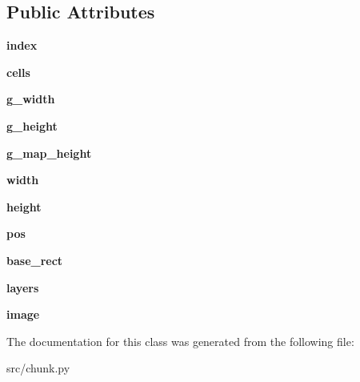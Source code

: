 \subsection*{Public Attributes}
\begin{DoxyCompactItemize}
\item 
\hypertarget{classsrc_1_1chunk_1_1_chunk_a5c816287a257c3913cfa1299f313a2c4}{}\label{classsrc_1_1chunk_1_1_chunk_a5c816287a257c3913cfa1299f313a2c4} 
{\bfseries index}
\item 
\hypertarget{classsrc_1_1chunk_1_1_chunk_ab3c6a9479b6ab41de0f1d261d2974796}{}\label{classsrc_1_1chunk_1_1_chunk_ab3c6a9479b6ab41de0f1d261d2974796} 
{\bfseries cells}
\item 
\hypertarget{classsrc_1_1chunk_1_1_chunk_a1fe08165c2a9f83e277531b6e6809b18}{}\label{classsrc_1_1chunk_1_1_chunk_a1fe08165c2a9f83e277531b6e6809b18} 
{\bfseries g\+\_\+width}
\item 
\hypertarget{classsrc_1_1chunk_1_1_chunk_a538c061a8552e2dc388b0f1ebb18cdc0}{}\label{classsrc_1_1chunk_1_1_chunk_a538c061a8552e2dc388b0f1ebb18cdc0} 
{\bfseries g\+\_\+height}
\item 
\hypertarget{classsrc_1_1chunk_1_1_chunk_af643c615d90588e4562f2f3ce4dea7c4}{}\label{classsrc_1_1chunk_1_1_chunk_af643c615d90588e4562f2f3ce4dea7c4} 
{\bfseries g\+\_\+map\+\_\+height}
\item 
\hypertarget{classsrc_1_1chunk_1_1_chunk_a1a79b666024d683456a617686d6a2ca2}{}\label{classsrc_1_1chunk_1_1_chunk_a1a79b666024d683456a617686d6a2ca2} 
{\bfseries width}
\item 
\hypertarget{classsrc_1_1chunk_1_1_chunk_a7867388e5f0e24d9c7661baa9d350170}{}\label{classsrc_1_1chunk_1_1_chunk_a7867388e5f0e24d9c7661baa9d350170} 
{\bfseries height}
\item 
\hypertarget{classsrc_1_1chunk_1_1_chunk_a9d8dca536e1f7f9347fb19db7888098c}{}\label{classsrc_1_1chunk_1_1_chunk_a9d8dca536e1f7f9347fb19db7888098c} 
{\bfseries pos}
\item 
\hypertarget{classsrc_1_1chunk_1_1_chunk_ada69235ab6825d1362515c389e73caf3}{}\label{classsrc_1_1chunk_1_1_chunk_ada69235ab6825d1362515c389e73caf3} 
{\bfseries base\+\_\+rect}
\item 
\hypertarget{classsrc_1_1chunk_1_1_chunk_acdf7dc448b4dc155cdd64f37c1cb1d2b}{}\label{classsrc_1_1chunk_1_1_chunk_acdf7dc448b4dc155cdd64f37c1cb1d2b} 
{\bfseries layers}
\item 
\hypertarget{classsrc_1_1chunk_1_1_chunk_aa77c24ac65ef09e6b3ee6d2630297cb6}{}\label{classsrc_1_1chunk_1_1_chunk_aa77c24ac65ef09e6b3ee6d2630297cb6} 
{\bfseries image}
\end{DoxyCompactItemize}


The documentation for this class was generated from the following file\+:\begin{DoxyCompactItemize}
\item 
src/chunk.\+py\end{DoxyCompactItemize}
